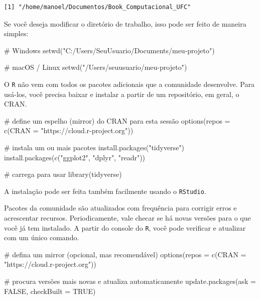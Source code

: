 \documentclass[
  letterpaper,
  DIV=11,
  numbers=noendperiod]{scrreprt}
\newenvironment{Shaded}{\begin{snugshade}}{\end{snugshade}}
\newcommand{\AttributeTok}[1]{\textcolor[rgb]{0.40,0.45,0.13}{#1}}
\newcommand{\CommentTok}[1]{\textcolor[rgb]{0.37,0.37,0.37}{#1}}
\newcommand{\ConstantTok}[1]{\textcolor[rgb]{0.56,0.35,0.01}{#1}}
\newcommand{\FunctionTok}[1]{\textcolor[rgb]{0.28,0.35,0.67}{#1}}
\newcommand{\NormalTok}[1]{\textcolor[rgb]{0.00,0.23,0.31}{#1}}
\newcommand{\StringTok}[1]{\textcolor[rgb]{0.13,0.47,0.30}{#1}}
\begin{document}
\begin{verbatim}
[1] "/home/manoel/Documentos/Book_Computacional_UFC"
\end{verbatim}

Se você deseja modificar o diretório de trabalho, isso pode ser feito de
maneira simples:

\begin{Shaded}
\begin{Highlighting}[]
\CommentTok{\# Windows}
\FunctionTok{setwd}\NormalTok{(}\StringTok{"C:/Users/SeuUsuario/Documents/meu{-}projeto"}\NormalTok{)}

\CommentTok{\# macOS / Linux}
\FunctionTok{setwd}\NormalTok{(}\StringTok{"/Users/seuusuario/meu{-}projeto"}\NormalTok{)}
\end{Highlighting}
\end{Shaded}

O \texttt{R} não vem com todos os pacotes adicionais que a comunidade
desenvolve. Para usá-los, você precisa baixar e instalar a partir de um
repositório, em geral, o CRAN.

\begin{Shaded}
\begin{Highlighting}[]
\CommentTok{\# define um espelho (mirror) do CRAN para esta sessão}
\FunctionTok{options}\NormalTok{(}\AttributeTok{repos =} \FunctionTok{c}\NormalTok{(}\AttributeTok{CRAN =} \StringTok{"https://cloud.r{-}project.org"}\NormalTok{))}

\CommentTok{\# instala um ou mais pacotes}
\FunctionTok{install.packages}\NormalTok{(}\StringTok{"tidyverse"}\NormalTok{)}
\FunctionTok{install.packages}\NormalTok{(}\FunctionTok{c}\NormalTok{(}\StringTok{"ggplot2"}\NormalTok{, }\StringTok{"dplyr"}\NormalTok{, }\StringTok{"readr"}\NormalTok{))}

\CommentTok{\# carrega para usar}
\FunctionTok{library}\NormalTok{(tidyverse)}
\end{Highlighting}
\end{Shaded}

A instalação pode ser feita também facilmente usando o \texttt{RStudio}.

Pacotes da comunidade são atualizados com frequência para corrigir erros
e acrescentar recursos. Periodicamente, vale checar se há novas versões
para o que você já tem instalado. A partir do console do \texttt{R},
você pode verificar e atualizar com um único comando.

\begin{Shaded}
\begin{Highlighting}[]
\CommentTok{\# defina um mirror (opcional, mas recomendável)}
\FunctionTok{options}\NormalTok{(}\AttributeTok{repos =} \FunctionTok{c}\NormalTok{(}\AttributeTok{CRAN =} \StringTok{"https://cloud.r{-}project.org"}\NormalTok{))}

\CommentTok{\# procura versões mais novas e atualiza automaticamente}
\FunctionTok{update.packages}\NormalTok{(}\AttributeTok{ask =} \ConstantTok{FALSE}\NormalTok{, }\AttributeTok{checkBuilt =} \ConstantTok{TRUE}\NormalTok{)}
\end{Highlighting}
\end{Shaded}
\end{document}
